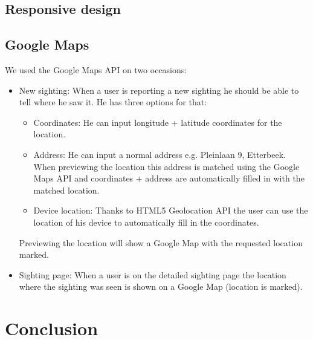\documentclass{article}
\begin{document}
\subsection{Responsive design}

\subsection{Google Maps}
We used the Google Maps API on two occasions:
\begin{itemize}
\item New sighting: When a user is reporting a new sighting he should be able to tell where he saw it. He has three options for that:
\begin{itemize}
\item Coordinates: He can input longitude + latitude coordinates for the location.
\item Address: He can input a normal address e.g. Pleinlaan 9, Etterbeek. When previewing the location this address is matched using the Google Maps API and coordinates + address are automatically filled in with the matched location.
\item Device location: Thanks to HTML5 Geolocation API the user can use the location of his device to automatically fill in the coordinates.
\end{itemize}
Previewing the location will show a Google Map with the requested location marked.
\item Sighting page: When a user is on the detailed sighting page the location where the sighting was seen is shown on a Google Map (location is marked).
\end{itemize}

\section{Conclusion}
\end{document}
